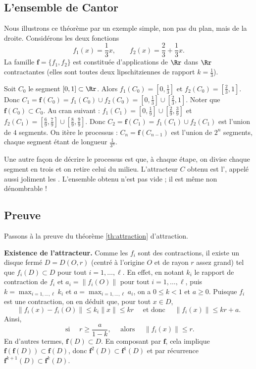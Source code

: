 \documentclass[11pt,class=report,crop=false]{standalone}
\begin{document}
\subsection{L'ensemble de Cantor}


Nous illustrons ce théorème par un exemple simple, 
non pas du plan, mais de la droite.
Considérons les deux fonctions
$$f_1(x)=\frac 13x, \qquad f_2(x)=\frac 23 + \frac 13x.$$
La famille $\mathbf{f}=\{f_1,f_2\}$ est constituée d'applications 
de $\Rr$ dans $\Rr$ contractantes (elles sont toutes deux
lipschitziennes de rapport $k=\frac 13$).


Soit $C_0$ le segment $[0,1] \subset \Rr$. Alors
$f_1(C_0)=[0,\frac 13]$ et $f_2(C_0) = [\frac 23, 1]$.
Donc $C_1 = \mathbf{f}(C_0) = f_1(C_0)\cup f_2(C_0) = [0,\frac 13] \cup [\frac 23, 1]$. Noter que $\mathbf{f}(C_0) \subset C_0$.
Au cran suivant :
$f_1(C_1) = [0,\frac 19] \cup [\frac 29,\frac 39]$
et $f_2(C_1) = [\frac69,\frac 79] \cup [\frac 89,\frac 99]$.
Donc $C_2 = \mathbf{f}(C_1) = f_1(C_1) \cup f_2(C_1)$ est l'union de $4$ segments.
On itère le processus :
$C_n= \mathbf{f}(C_{n-1})$ est l'union de $2^n$ segments, 
chaque segment étant de longueur $\frac{1}{3^n}$.

Une autre façon de décrire le processus est que, à chaque étape,
on divise chaque segment en trois et on retire celui du milieu.
L'attracteur $C$ obtenu est l', appelé
aussi joliment les .
L'ensemble obtenu n'est pas vide ; il est même non dénombrable !


\subsection{Preuve}

Passons à la preuve du théorème \ref{th:attraction} d'attraction.

\textbf{Existence de l'attracteur.}
Comme les $f_i$ sont des contractions, il existe un disque fermé $D= D(O,r)$
(centré à l'origine $O$ et de rayon $r$ assez grand) tel que
$f_i(D) \subset D$ pour tout $i=1,\ldots,\ell$.
En effet, en notant $k_i$ le rapport de contraction de $f_i$ et 
$a_i = \| f_i(O) \|$ pour tout $i = 1,\ldots,\ell$,
puis $k = \max_{i=1,\ldots,\ell} k_i$
et $a = \max_{i=1,\ldots,\ell} a_i$, 
on a $0 \le k < 1$ et $a \ge 0$.
Puisque $f_i$ est une contraction, on en déduit que, pour tout $x \in D$,
$$\| f_i(x)-f_i(O) \| \le k_i \| x \| \le kr
\quad \text{ et donc } \quad
\| f_i(x) \| \le kr+a.$$
Ainsi, 
$$\text{ si } \quad  r \ge \frac{a}{1-k}, \quad \text{ alors } \quad \| f_i(x) \| \le r.$$
En d'autres termes, $\mathbf{f}(D) \subset D$.
En composant par $\mathbf{f}$, cela implique $\mathbf{f}\left(\mathbf{f}(D) \right) \subset \mathbf{f}(D)$,
donc $\mathbf{f}^2(D) \subset \mathbf{f}^1(D)$
et par récurrence $\mathbf{f}^{k+1}(D) \subset \mathbf{f}^k(D)$.
\end{document}
